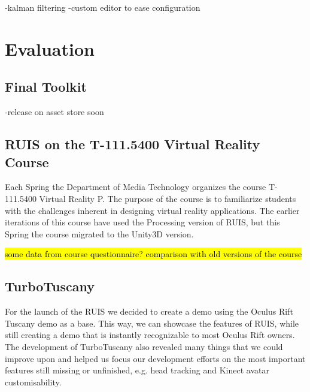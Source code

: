 \documentclass[12pt,a4paper,oneside,pdftex]{report}
\begin{document}
-kalman filtering
-custom editor to ease configuration



\chapter{Evaluation}
\label{chapter:evaluation}

\section{Final Toolkit}
\label{section:finaltoolkit}

-release on asset store soon

\section{RUIS on the T-111.5400 Virtual Reality Course}
\label{section:vrcourse}

Each Spring the Department of Media Technology organizes the course T-111.5400 Virtual Reality P. The purpose of the course is to familiarize students with the challenges inherent in designing virtual reality applications. The earlier iterations of this course have used the Processing version of RUIS, but this Spring the course migrated to the Unity3D version. 

\hl{some data from course questionnaire? comparison with old versions of the course}

\section{TurboTuscany}
\label{section:turbotuscany}

For the launch of the RUIS we decided to create a demo using the Oculus Rift Tuscany demo as a base. This way, we can showcase the features of RUIS, while still creating a demo that is instantly recognizable to most Oculus Rift owners. The development of TurboTuscany also revealed many things that we could improve upon and helped us focus our development efforts on the most important features still missing or unfinished, e.g. head tracking and Kinect avatar customisability.
\end{document}
